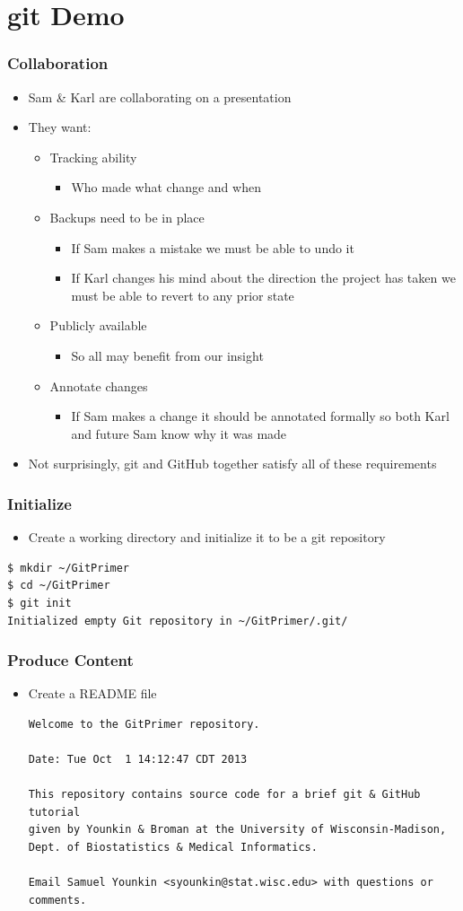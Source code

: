 \documentclass[12pt,t]{beamer}
\newcommand{\bi}{\begin{itemize}}
\newcommand{\bbi}{\vspace{24pt} \begin{itemize} \itemsep8pt}
\newcommand{\ei}{\end{itemize}}
\begin{document}
\section{git Demo}

\begin{frame}[fragile]
\frametitle{Collaboration}
\bi
\item Sam \& Karl are collaborating on a presentation
\item They want:
\bi
\item Tracking ability
\bi\item Who made what change and when\ei
\item Backups need to be in place
\bi\item If Sam makes a mistake we must be able to undo it
\item If Karl changes his mind about the direction the project has taken we must be able to revert to any prior state
\ei
\item Publicly available
\bi\item So all may benefit from our insight\ei
\item Annotate changes
\bi\item If Sam makes a change it should be annotated formally so both Karl and future Sam know why it was made\ei
\ei
\item Not surprisingly, git and GitHub together satisfy all of these requirements
\ei
\end{frame}

\begin{frame}[fragile]
\frametitle{Initialize}
\bbi
\item Create a working directory and initialize it to be a git
  repository
\ei
\begin{semiverbatim}
\begin{lstlisting}
$ mkdir ~/GitPrimer
$ cd ~/GitPrimer
$ git init
Initialized empty Git repository in ~/GitPrimer/.git/
\end{lstlisting}
\end{semiverbatim}
\end{frame}

\begin{frame}[fragile]
\frametitle{Produce Content}
\bbi
\item Create a README file

\begin{semiverbatim}
\begin{lstlisting}
Welcome to the GitPrimer repository.

Date: Tue Oct  1 14:12:47 CDT 2013

This repository contains source code for a brief git & GitHub tutorial
given by Younkin & Broman at the University of Wisconsin-Madison,
Dept. of Biostatistics & Medical Informatics.

Email Samuel Younkin <syounkin@stat.wisc.edu> with questions or
comments.
\end{lstlisting}
\end{semiverbatim}
\ei
\end{frame}
\end{document}
